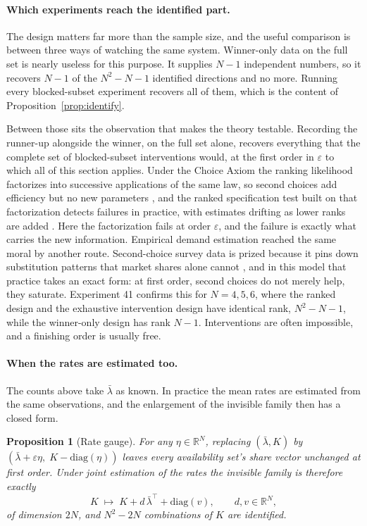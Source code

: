 \documentclass[11pt]{article}
\newtheorem{proposition}{Proposition}
\theoremstyle{remark}
\newcommand{\R}{\mathbb{R}}
\newcommand{\lbar}{\bar{\lambda}}
\begin{document}
\paragraph{Which experiments reach the identified part.} The design matters far
more than the sample size, and the useful comparison is between three ways of
watching the same system. Winner-only data on the full set is nearly useless
for this purpose. It supplies $N-1$ independent numbers, so it recovers $N-1$ of
the $N^2 - N - 1$ identified directions and no more. Running every
blocked-subset experiment recovers all of them, which is the content of
Proposition~\ref{prop:identify}.

Between those sits the observation that makes the theory testable. Recording
the runner-up alongside the winner, on the full set alone, recovers everything
that the complete set of blocked-subset interventions would, at the first
order in $\varepsilon$ to which all of this section applies. Under the Choice Axiom the ranking likelihood
factorizes into successive applications of the same law, so second choices add
efficiency but no new parameters \citep{beggs1981}, and the ranked
specification test built on that factorization detects failures in practice,
with estimates drifting as lower ranks are added
\citep{hausmanruud1987}. Here the factorization fails at order $\varepsilon$,
and the failure is exactly what carries the new information. Empirical demand
estimation reached the same moral by another route. Second-choice survey data
is prized because it pins down substitution patterns that market shares alone
cannot \citep{berry2004}, and in this model that practice takes an exact form:
at first order, second choices do not merely help, they saturate.
Experiment 41 confirms this for $N = 4, 5, 6$, where the ranked design and the
exhaustive intervention design have identical rank, $N^2 - N - 1$, while the
winner-only design has rank $N-1$. Interventions are often impossible, and a
finishing order is usually free.

\paragraph{When the rates are estimated too.} The counts above take
$\lbar$ as known. In practice the mean rates are estimated from the same
observations, and the enlargement of the invisible family then has a closed
form.

\begin{proposition}[Rate gauge]\label{prop:gauge}
For any $\eta \in \R^N$, replacing $(\lbar, K)$ by
$(\lbar + \varepsilon\eta,\; K - \mathrm{diag}(\eta))$ leaves every
availability set's share vector unchanged at first order. Under joint
estimation of the rates the invisible family is therefore exactly
\[
  K \;\longmapsto\; K + d\,\lbar^\top + \mathrm{diag}(v),
  \qquad d, v \in \R^N,
\]
of dimension $2N$, and $N^2 - 2N$ combinations of $K$ are identified.
\end{proposition}
\end{document}
